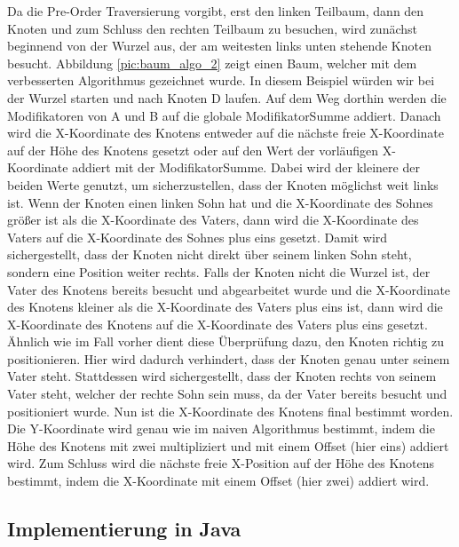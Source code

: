 Da die Pre-Order Traversierung vorgibt, erst den linken Teilbaum, dann den Knoten und zum Schluss den rechten Teilbaum zu besuchen,
wird zunächst beginnend von der Wurzel aus, der am weitesten links unten stehende Knoten besucht. Abbildung \ref{pic:baum_algo_2}
zeigt einen Baum, welcher mit dem verbesserten Algorithmus gezeichnet wurde. In diesem Beispiel würden wir bei der Wurzel starten 
und nach Knoten D laufen. Auf dem Weg dorthin werden die Modifikatoren von A und B auf die globale ModifikatorSumme addiert.
Danach wird die X-Koordinate des Knotens entweder auf die nächste freie X-Koordinate auf der Höhe des Knotens gesetzt oder auf den
Wert der vorläufigen X-Koordinate addiert mit der ModifikatorSumme. Dabei wird der kleinere der beiden Werte genutzt, um sicherzustellen,
dass der Knoten möglichst weit links ist. Wenn der Knoten einen linken Sohn hat und die X-Koordinate des Sohnes größer ist als
die X-Koordinate des Vaters, dann wird die X-Koordinate des Vaters auf die X-Koordinate des Sohnes plus eins gesetzt. 
Damit wird sichergestellt, dass der Knoten nicht direkt über seinem linken Sohn steht, sondern eine Position weiter rechts.
Falls der Knoten nicht die Wurzel ist, der Vater des Knotens bereits besucht und abgearbeitet wurde und die X-Koordinate des Knotens
kleiner als die X-Koordinate des Vaters plus eins ist, dann wird die X-Koordinate des Knotens auf die X-Koordinate des Vaters plus eins gesetzt.
Ähnlich wie im Fall vorher dient diese Überprüfung dazu, den Knoten richtig zu positionieren. Hier wird dadurch verhindert,
dass der Knoten genau unter seinem Vater steht. Stattdessen wird sichergestellt, dass der Knoten rechts von seinem Vater steht,
welcher der rechte Sohn sein muss, da der Vater bereits besucht und positioniert wurde. Nun ist die X-Koordinate des Knotens final
bestimmt worden. Die Y-Koordinate wird genau wie im naiven Algorithmus bestimmt, indem die Höhe des Knotens mit zwei multipliziert
und mit einem Offset (hier eins) addiert wird. Zum Schluss wird die nächste freie X-Position auf der Höhe des Knotens bestimmt,
indem die X-Koordinate mit einem Offset (hier zwei) addiert wird. 


\subsection{Implementierung in Java}

